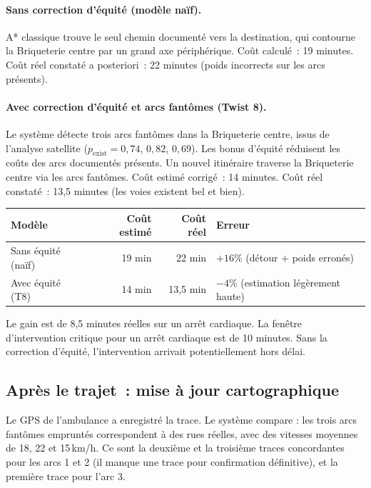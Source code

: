 \documentclass[12pt,a4paper]{article}
\theoremstyle{definition}
\theoremstyle{remark}
\begin{document}
\paragraph{Sans correction d'équité (modèle naïf).}
A* classique trouve le seul chemin documenté vers la destination,
qui contourne la Briqueterie centre par un grand axe périphérique.
Coût calculé~: 19 minutes. Coût réel constaté a posteriori~: 22 minutes
(poids incorrects sur les arcs présents).

\paragraph{Avec correction d'équité et arcs fantômes (Twist 8).}
Le système détecte trois arcs fantômes dans la Briqueterie centre,
issus de l'analyse satellite ($p_\text{exist} = 0{,}74$, $0{,}82$, $0{,}69$).
Les bonus d'équité réduisent les coûts des arcs documentés présents.
Un nouvel itinéraire traverse la Briqueterie centre via les arcs fantômes.
Coût estimé corrigé~: 14 minutes. Coût réel constaté~: 13,5 minutes
(les voies existent bel et bien).

\begin{center}
\begin{tabular}{lrrl}
  \toprule
  \textbf{Modèle} & \textbf{Coût estimé} & \textbf{Coût réel} & \textbf{Erreur} \\
  \midrule
  Sans équité (naïf)  & 19 min & 22 min & $+16\%$ (détour + poids erronés) \\
  Avec équité (T8)    & 14 min & 13,5 min & $-4\%$ (estimation légèrement haute) \\
  \bottomrule
\end{tabular}
\end{center}

Le gain est de 8,5 minutes réelles sur un arrêt cardiaque.
La fenêtre d'intervention critique pour un arrêt cardiaque est de
10 minutes. Sans la correction d'équité, l'intervention arrivait
potentiellement hors délai.

\subsection{Après le trajet~: mise à jour cartographique}

Le GPS de l'ambulance a enregistré la trace. Le système compare :
les trois arcs fantômes empruntés correspondent à des rues réelles,
avec des vitesses moyennes de 18, 22 et 15\,km/h. Ce sont la deuxième
et la troisième traces concordantes pour les arcs 1 et 2
(il manque une trace pour confirmation définitive), et la première
trace pour l'arc 3.
\end{document}
